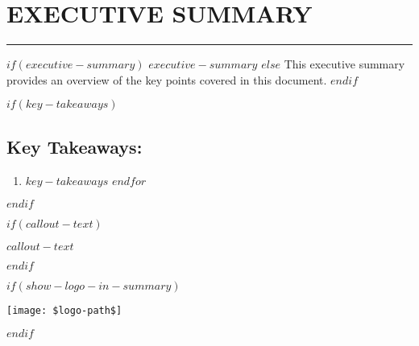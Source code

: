 \chapter*{EXECUTIVE SUMMARY}

\textcolor{primaryblue}{\rule{\textwidth}{2pt}}

$if(executive-summary)$
$executive-summary$
$else$
This executive summary provides an overview of the key points covered in this document.
$endif$

$if(key-takeaways)$
\section*{Key Takeaways:}

\begin{enumerate}
$for(key-takeaways)$
  \item $key-takeaways$
$endfor$
\end{enumerate}
$endif$

$if(callout-text)$
\begin{tcolorbox}[colframe=primaryorange, boxrule=1mm, arc=0mm]
\textbf{$callout-text$}
\end{tcolorbox}
$endif$

$if(show-logo-in-summary)$
\begin{flushright}
\texttt{[image: \$logo-path\$]}
\end{flushright}
$endif$